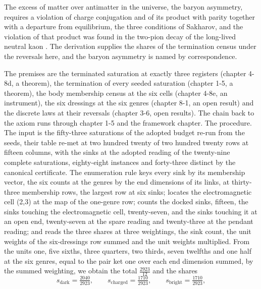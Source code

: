 \begin{chbridge}
The excess of matter over antimatter in the universe, the baryon asymmetry, requires a violation of charge conjugation and of its product with parity together with a departure from equilibrium, the three conditions of Sakharov, and the violation of that product was found in the two-pion decay of the long-lived neutral kaon \cite{Sakharov1967,Christenson1964}. The derivation supplies the shares of the termination census under the reversals here, and the baryon asymmetry is named by correspondence.
\end{chbridge}
\begin{chproof}
The premises are the terminated saturation at exactly three registers (chapter 4-8d, a theorem), the termination of every seeded saturation (chapter 1-5, a theorem), the body membership census at the six cells (chapter 4-8e, an instrument), the six dressings at the six genres (chapter 8-1, an open result) and the discrete laws at their reversals (chapter 3-6, open results). The chain back to the axiom runs through chapter 1-5 and the framework chapter. The procedure. The input is the fifty-three saturations of the adopted budget re-run from the seeds, their table re-met at two hundred twenty of two hundred twenty rows at fifteen columns, with the sinks at the adopted reading of the twenty-nine complete saturations, eighty-eight instances and forty-three distinct by the canonical certificate. The enumeration rule keys every sink by its membership vector, the six counts at the genres by the end dimensions of its links, at thirty-three membership rows, the largest row at six sinks; locates the electromagnetic cell (2,3) at the map of the one-genre row; counts the docked sinks, fifteen, the sinks touching the electromagnetic cell, twenty-seven, and the sinks touching it at an open end, twenty-seven at the spare reading and twenty-three at the pendant reading; and reads the three shares at three weightings, the sink count, the unit weights of the six-dressings row summed and the unit weights multiplied. From the units one, five sixths, three quarters, two thirds, seven twelfths and one half at the six genres, equal to the pair ket one over each end dimension summed, by the summed weighting, we obtain the total $\tfrac{2923}{12}$ and the shares
\begin{equation}
s_{\mathrm{dark}} = \tfrac{2040}{2923} , \qquad s_{\mathrm{charged}} = \tfrac{1710}{2923} , \qquad s_{\mathrm{bright}} = \tfrac{1710}{2923} ,
\end{equation}

\end{chproof}
